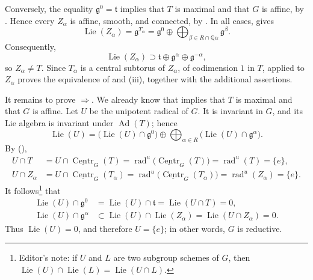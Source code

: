 Conversely, the equality \(\mathfrak g^{0}=\mathfrak t\) implies that
\(T\) is maximal and that \(G\) is affine, by .  Hence every
\(Z_{\alpha}\) is affine, smooth, and connected, by .  In all cases,
 gives
\[
  \operatorname{Lie}(Z_{\alpha})
  =
  \mathfrak g^{T_{\alpha}}
  =
  \mathfrak g^{0}
  \oplus
  \bigoplus_{\beta\in R\cap\mathbb Q\alpha}
    \mathfrak g^{\beta}.
\]
Consequently,
\[
  \operatorname{Lie}(Z_{\alpha})
  \supset
  \mathfrak t\oplus
  \mathfrak g^{\alpha}\oplus
  \mathfrak g^{-\alpha},
\]
so \(Z_{\alpha}\ne T\).  Since \(T_{\alpha}\) is a central subtorus of
\(Z_{\alpha}\), of codimension \(1\) in \(T\),  applied to
\(Z_{\alpha}\) proves the equivalence of  and (iii), together with
the additional assertions.

It remains to prove \(\Rightarrow\).  We already know that 
implies that \(T\) is maximal and that \(G\) is affine.  Let \(U\) be
the unipotent radical of \(G\).  It is invariant in \(G\), and its Lie
algebra is invariant under \(\operatorname{Ad}(T)\); hence
\[
  \operatorname{Lie}(U)
  =
  \bigl(\operatorname{Lie}(U)\cap\mathfrak g^{0}\bigr)
  \oplus
  \bigoplus_{\alpha\in R}
    \bigl(\operatorname{Lie}(U)\cap\mathfrak g^{\alpha}\bigr).
\]
By (),
\[
\begin{aligned}
  U\cap T
    &=
    U\cap\underline{\operatorname{Centr}}_{G}(T)
     =
    \operatorname{rad}^{u}
      \bigl(\underline{\operatorname{Centr}}_{G}(T)\bigr)
     =
    \operatorname{rad}^{u}(T)
     =
    \{e\},\\
  U\cap Z_{\alpha}
    &=
    U\cap\underline{\operatorname{Centr}}_{G}(T_{\alpha})
     =
    \operatorname{rad}^{u}
      \bigl(\underline{\operatorname{Centr}}_{G}(T_{\alpha})\bigr)
     =
    \operatorname{rad}^{u}(Z_{\alpha})
     =
    \{e\}.
\end{aligned}
\]
It follows\footnote{Editor's note: if \(U\) and \(L\) are two subgroup
schemes of \(G\), then
\(\operatorname{Lie}(U)\cap\operatorname{Lie}(L)
=\operatorname{Lie}(U\cap L)\).} that
\[
\begin{aligned}
  \operatorname{Lie}(U)\cap\mathfrak g^{0}
    &=
    \operatorname{Lie}(U)\cap\mathfrak t
     =
    \operatorname{Lie}(U\cap T)
     =
    0,\\
  \operatorname{Lie}(U)\cap\mathfrak g^{\alpha}
    &\subset
    \operatorname{Lie}(U)\cap\operatorname{Lie}(Z_{\alpha})
     =
    \operatorname{Lie}(U\cap Z_{\alpha})
     =
    0.
\end{aligned}
\]
Thus \(\operatorname{Lie}(U)=0\), and therefore \(U=\{e\}\); in other
words, \(G\) is reductive.

